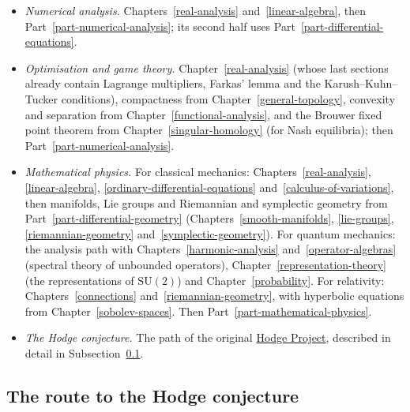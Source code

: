 \begin{itemize}
normal form of Chapter~\ref{linear-algebra}; then Part~\ref{part-differential-equations}. Flows on manifolds use Chapter~\ref{smooth-manifolds}, read informally until
Part~\ref{part-differential-geometry}.
\item \emph{Numerical analysis.} Chapters~\ref{real-analysis} and~\ref{linear-algebra}, then Part~\ref{part-numerical-analysis}; its second half uses
Part~\ref{part-differential-equations}.
\item \emph{Optimisation and game theory.} Chapter~\ref{real-analysis} (whose last sections already contain Lagrange multipliers, Farkas' lemma and the Karush--Kuhn--Tucker
conditions), compactness from Chapter~\ref{general-topology}, convexity and separation from Chapter~\ref{functional-analysis}, and the Brouwer fixed point theorem from
Chapter~\ref{singular-homology} (for Nash equilibria); then Part~\ref{part-numerical-analysis}.
\item \emph{Mathematical physics.} For classical mechanics: Chapters~\ref{real-analysis}, \ref{linear-algebra}, \ref{ordinary-differential-equations}
and~\ref{calculus-of-variations}, then manifolds, Lie groups and Riemannian and symplectic geometry from Part~\ref{part-differential-geometry}
(Chapters~\ref{smooth-manifolds}, \ref{lie-groups}, \ref{riemannian-geometry} and~\ref{symplectic-geometry}). For quantum mechanics: the analysis path with
Chapters~\ref{harmonic-analysis} and~\ref{operator-algebras} (spectral theory of unbounded operators), Chapter~\ref{representation-theory} (the representations of
$\mathrm{SU}(2)$) and Chapter~\ref{probability}. For relativity: Chapters~\ref{connections} and~\ref{riemannian-geometry}, with hyperbolic equations from
Chapter~\ref{sobolev-spaces}. Then Part~\ref{part-mathematical-physics}.
\item \emph{The Hodge conjecture.} The path of the original
\href{https://lufranovittorio.github.io/Appunti_Matematica/}{Hodge Project}, described in detail in Subsection~\ref{introduction:subsection-direct-route}.
\end{itemize}

\subsection{The route to the Hodge conjecture}\label{introduction:subsection-direct-route}

